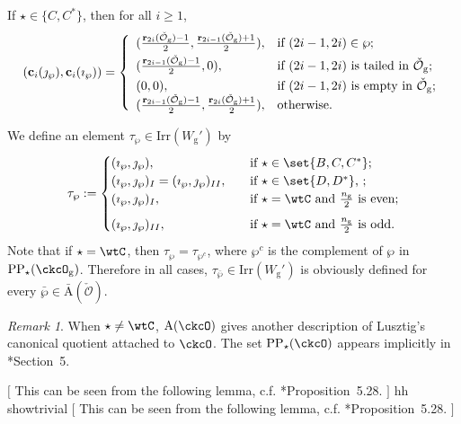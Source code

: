 \documentclass[12pt,a4paper]{amsart}
\newcommand{\trivial}[2][]{\if\relax\detokenize{#1}\relax
  {%
      \color{orange} \vspace{0em} $[$  #2 $]$
      \color{black}
  }
  \else
\ifx#1h
\ifcsname showtrivial\endcsname
{%
    \color{orange} \vspace{0em}  $[$ #2 $]$
    \color{black}
}
\fi
\else {\red Wrong argument!} \fi
\fi
}
\newcommand{\CO}{{\mathcal {O}}}
\numberwithin{equation}{section}
\theoremstyle{remark}
\newtheorem{remark}[thm]{Remark}
\def\Irr{\mathrm{Irr}}
\def\Wg{W_{\mathrm g}}
\def\imathp{\imath_{\wp}}
\def\jmathp{\jmath_{\wp}}
\def\CPP{\mathrm{PP}}
\def\CPPs{\mathrm{PP}_{\star}}
\begin{document}
If $\star\in\{C,C^*\}$, then for all $i\geq 1$,
\[
(\mathbf c_{i}(\jmath_\wp), \mathbf c_{i}(\imath_\wp))=
   \left\{
     \begin{array}{ll}
            (\frac{\mathbf r_{2i}(\check \CO_{\mathrm g})-1}{2},  \frac{\mathbf r_{2i-1}(\check \CO_{\mathrm g})+1}{2}), &\hbox{if $(2i-1, 2i)\in \wp$}; \smallskip\\
        (\frac{\mathbf r_{2i-1}(\check \CO_{\mathrm g})-1}{2},  0), & \hbox{if $(2i-1, 2i)$ is tailed in $\check \CO_{\mathrm g}$};\smallskip\\
         (0,  0), &\hbox{if $(2i-1, 2i)$ is empty in $\check \CO_{\mathrm g}$};\\
         (\frac{\mathbf r_{2i-1}(\check \CO_{\mathrm g})-1}{2},  \frac{\mathbf r_{2i}(\check \CO_{\mathrm g})+1}{2}), &\hbox{otherwise}.\\
            \end{array}
   \right.
\]


We define an element $\tau_{\wp}\in \Irr(\Wg')$ by
  \begin{equation}\label{eq:tauwp}
    \tau_{\wp} :=
    \begin{cases}
      (\imathp,\jmathp),  \quad &  \text{if } \star \in \set{B,C, C^{*} }; \\
      (\imathp,\jmathp)_{I}= (\imathp,\jmathp)_{II},  \quad &  \text{if   $ \star \in \set{D,D^{*}}$, };\\
       (\imathp,\jmathp)_I, \quad & \text{if $\star =\wtC$  and $ \frac{n_\mathrm g}{2}$ is even;}\medskip \\
            (\imathp,\jmathp)_{II}, \quad & \text{if $\star =\wtC$ and  $ \frac{n_\mathrm g}{2}$ is odd.}
    \end{cases}
  \end{equation}
  Note that  if $\star=\wtC$, then $\tau_{\wp} = \tau_{\wp^{c}}$, where $\wp^{c}$ is the complement of $\wp$ in $\CPPs(\ckcO_{\mathrm g})$.
Therefore in all cases,   $\tau_{\bar \wp}\in \Irr(\Wg')$ is obviously defined for every $\bar \wp\in \bar{\mathrm A}(\check \CO)$.



\begin{remark} When $\star\neq \wtC$, $\mathrm A(\ckcO)$ gives another description of Lusztig's canonical
  quotient attached to $\ckcO$. The set $\CPP_{\star}(\ckcO)$ appears implicitly in
\cite{So}*{Section~5}.

  \trivial[h]{ This can be seen from the following
    lemma, c.f. \cite{BVUni}*{Proposition~5.28}. }
\end{remark}
\end{document}

